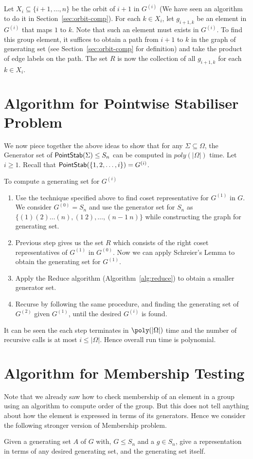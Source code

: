 Let $X_i \subseteq \{i+1, \ldots, n\}$ be the orbit of $i+1$ in $G^{(i)}$ (We
have seen an algorithm to do it in Section~\ref{sec:orbit-comp}). 
For each $k \in X_i$, let $g_{i+1, k}$ be an element in $G^{(i)}$ that maps
$1$ to $k$. Note that such an element must exists in $G^{(i)}$. To find this
group element, it suffices to obtain a path from $i+1$ to $k$ in the graph of
generating set (see Section~\ref{sec:orbit-comp} for definition) and take the
product of edge labels on the path. The set $R$ is now the collection of all
$g_{i+1,k}$ for each $k \in X_i$.

\section{Algorithm for Pointwise Stabiliser Problem}
We now piece together the above ideas to show that for any
$\Sigma\subseteq\Omega$, the Generator set of ${\sf PointStab}(\Sigma) \le S_n$ can
be computed in $poly(|\Omega|)$ time. Let $i \ge 1$. Recall that
${\sf PointStab}(\{1,2,\ldots,i\}) = G^{(i)}$. 

To compute a generating set for $G^{(i)}$
\begin{enumerate}
	\item Use the technique specified above to find coset representative for
		$G^{(1)}$ in $G$. We consider $G^{(0)} = S_n$ and use the
		generator set for $S_n$ as $\{ (1)(2)\ldots(n), (1~2), \ldots,
		(n-1~n)\}$ while constructing the graph for generating set.
	\item  Previous step gives us the set $R$ which consists of the right
		coset representatives of $G^{(1)}$ in $G^{(0)}$. Now we can
		apply Schreier's Lemma to obtain the generating set for
		$G^{(1)}$. 
	\item  Apply the {\sc Reduce} algorithm (Algorithm~\ref{alg:reduce})
		to obtain a smaller generator set.
	\item  Recurse by following the same procedure, and finding the
		generating set of $G^{(2)}$ given $G^{(1)}$, until the desired
		$G^{(i)}$ is found. 
\end{enumerate}
It can be seen the each step terminates in $\poly(|\Omega|)$ time and the
number of recursive calls is at most $i \le |\Omega|$. Hence overall run time is
polynomial.


\section{Algorithm for Membership Testing}
Note that we already saw how to check membership of an element in a group
using an algorithm to compute order of the group. But this does not tell
anything about how the element is expressed in terms of its generators. Hence
we consider the following stronger version of Membership problem. 
\begin{problem}
Given a generating set $A$ of $G$ with, $G \leq S_n$ and a $g\in S_n$, give a
representation in terms of any desired generating set, and the generating set 
itself.
\end{problem} 

